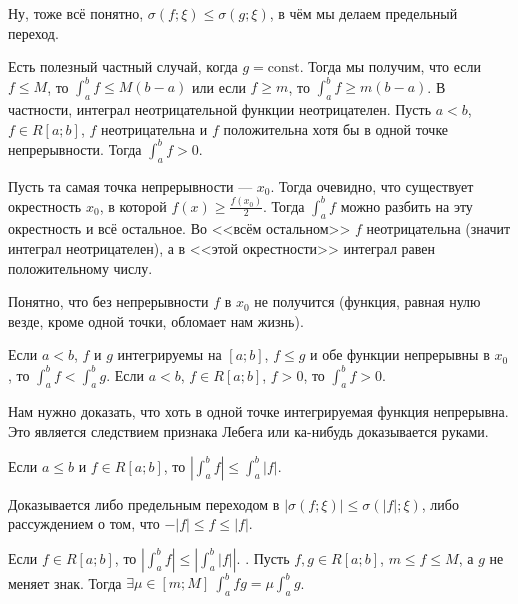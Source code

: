 \documentclass{article}
\begin{document}
\begin{itemize}
\begin{Comment}
        \end{Comment}
        \begin{Proof}
            Ну, тоже всё понятно, $\sigma(f;\xi)\leqslant\sigma(g;\xi)$, в чём мы делаем предельный переход.
        \end{Proof}
        \thm Есть полезный частный случай, когда $g=\mathrm{const}$. Тогда мы получим, что если $f\leqslant M$, то $\int_a^bf\leqslant M(b-a)$ или если $f\geqslant m$, то $\int_a^bf\geqslant m(b-a)$. В частности, интеграл неотрицательной функции неотрицателен.
        \thm Пусть $a<b$, $f\in R[a;b]$, $f$ неотрицательна и $f$ положительна хотя бы в одной точке непрерывности. Тогда $\int_a^bf>0$.
        \begin{Proof}
            Пусть та самая точка непрерывности --- $x_0$. Тогда очевидно, что существует окрестность $x_0$, в которой $f(x)\geqslant\frac{f(x_0)}2$. Тогда $\int_a^bf$ можно разбить на эту окрестность и всё остальное. Во <<всём остальном>> $f$ неотрицательна (значит интеграл неотрицателен), а в <<этой окрестности>> интеграл равен положительному числу.
        \end{Proof}
        \begin{Comment}
            Понятно, что без непрерывности $f$ в $x_0$ не получится (функция, равная нулю везде, кроме одной точки, обломает нам жизнь).
        \end{Comment}
        \thm Если $a<b$, $f$ и $g$ интегрируемы на $[a;b]$, $f\leqslant g$ и обе функции непрерывны в $x_0$, то $\int_a^bf<\int_a^bg$.
        \thm Если $a<b$, $f\in R[a;b]$, $f>0$, то $\int_a^bf>0$.
        \begin{Proof}
            Нам нужно доказать, что хоть в одной точке интегрируемая функция непрерывна. Это является следствием признака Лебега или ка-нибудь доказывается руками.
        \end{Proof}
        \thm Если $a\leqslant b$ и $f\in R[a;b]$, то $\left|\int_a^bf\right|\leqslant\int_a^b|f|$.
        \begin{Proof}
            Доказывается либо предельным переходом в $|\sigma(f;\xi)|\leqslant\sigma(|f|;\xi)$, либо рассуждением о том, что $-|f|\leqslant f\leqslant|f|$.
        \end{Proof}
        \thm Если $f\in R[a;b]$, то $\left|\int_a^bf\right|\leqslant\left|\int_a^b|f|\right|$.
        \thm {}. Пусть $f,g\in R[a;b]$, $m\leqslant f\leqslant M$, а $g$ не меняет знак. Тогда $\exists\mu\in[m;M]~\int_a^bfg=\mu\int_a^bg$.

\end{itemize}
\end{document}
